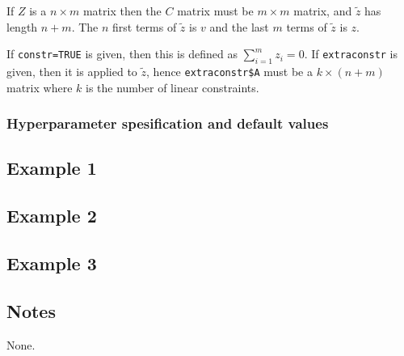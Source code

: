 \documentclass[a4paper,11pt]{article}
\begin{document}
If $Z$ is a $n\times m$ matrix then the $C$ matrix must be $m\times m$
matrix, and $\widetilde z$ has length $n+m$. The $n$ first terms of
$\widetilde z$ is $v$ and the last $m$ terms of $\widetilde z$ is $z$.

If \texttt{constr=TRUE} is given, then this is defined as
$\sum_{i=1}^{m}z_{i} = 0$. If \texttt{extraconstr} is given, then it
is applied to $\widetilde z$, hence \texttt{extraconstr\$A} must be a
$k\times (n+m)$ matrix where $k$ is the number of linear constraints.

\subsubsection*{Hyperparameter spesification and default values}



\subsection*{Example 1}

{\small}

\subsection*{Example 2}

{\small}

\subsection*{Example 3}

{\small}

\subsection*{Notes}

None.
\end{document}

